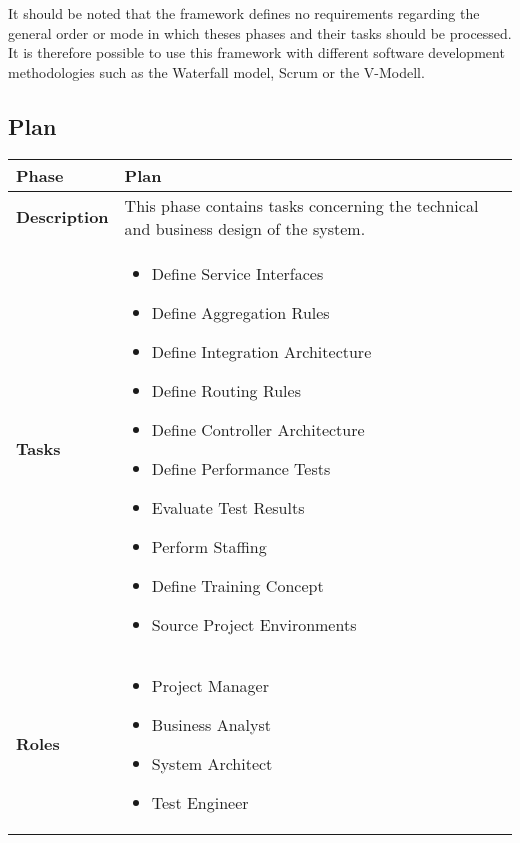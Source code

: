 It should be noted that the framework defines no requirements regarding the general order or mode in which theses phases and their tasks should be processed. It is therefore possible to use this framework with different software development methodologies such as the Waterfall model, Scrum or the V-Modell.

\subsection{Plan}
	\begin{tabularx}{\textwidth}{@{} l X @{}}
		\caption{Phase: Plan}\label{table:ch6_View_Plan}\\
		\toprule
		\bfseries Phase & Plan\\
		\midrule 
		\bfseries Description & This phase contains tasks concerning the technical and business design of the system.\\
		\midrule
		\bfseries Tasks & \begin{itemize}
			\item Define Service Interfaces
			\item Define Aggregation Rules
			\item Define Integration Architecture
			\item Define Routing Rules
			\item Define Controller Architecture
			\item Define Performance Tests
			\item Evaluate Test Results
			\item Perform Staffing
			\item Define Training Concept
			\item Source Project Environments
		\end{itemize}\\
		\midrule
		\bfseries Roles & \begin{itemize}
			\item Project Manager
			\item Business Analyst
			\item System Architect
			\item Test Engineer
		\end{itemize}\\
		\bottomrule
	\end{tabularx}
	
